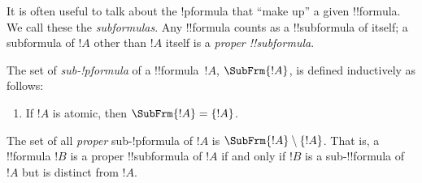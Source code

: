 \documentclass[../../include/open-logic-section]{subfiles}
\begin{document}


\begin{explain}
It is often useful to talk about the !p{formula} that ``make up'' a given
!!{formula}.  We call these the \emph{subformulas}.  Any !!{formula} counts as
a !!{subformula} of itself; a subformula of $!A$ other than $!A$ itself is
a \emph{proper !!{subformula}}.
\end{explain}

\begin{defn}
The set of \emph{sub-!p{formula}} of a !!{formula}~$!A$,
$\SubFrm{!A}$, is defined inductively as follows:
\begin{enumerate}
\item If $!A$ is atomic, then $\SubFrm{!A} = \{!A\}$.







\end{enumerate}
The set of all \emph{proper} sub-!p{formula} of $!A$ is $\SubFrm{!A} \setminus
\{!A\}$. That is, a !!{formula} $!B$ is a proper !!{subformula} of $!A$ if and
only if $!B$ is a sub-!!{formula} of $!A$ but is distinct from $!A$.
\end{defn}

\end{document}
